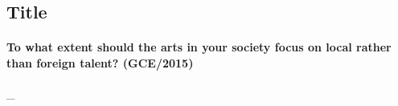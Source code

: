 \documentclass[../../main]{subfiles}
\begin{document}
\subsection{Title}

\paragraph{To what extent should the arts in your society focus on local rather than foreign talent? (GCE/2015)} \_
\end{document}
